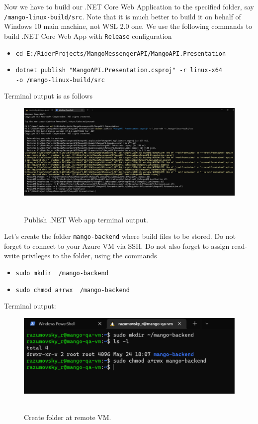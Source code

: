 Now we have to build our .NET Core Web Application to the specified folder, say \texttt{/mango-linux-build/src}.
Note that it is much better to build it on behalf of Windows 10 main machine, not WSL 2.0 one.
We use the following commands to build .NET Core Web App with \texttt{Release} configuration
\begin{itemize}
    \item \texttt{cd E:/RiderProjects/MangoMessengerAPI/MangoAPI.Presentation}
    \item \texttt{dotnet publish "MangoAPI.Presentation.csproj" -r linux-x64 \\ -o /mango-linux-build/src}
\end{itemize}
Terminal output is as follows
\begin{figure}[H]
    \centering
    \includegraphics[width=1\textwidth]{img/04_build_application}
    ~\caption{Publish .NET Web app terminal output.}\label{fig:figure9}
\end{figure}
Let's create the folder \texttt{mango-backend} where build files to be stored.
Do not forget to connect to your Azure VM via SSH\@.
Do not also forget to assign read-write privileges to the folder, using the commands
\begin{itemize}
    \item \texttt{sudo mkdir ~/mango-backend}
    \item \texttt{sudo chmod a+rwx ~/mango-backend}
\end{itemize}
Terminal output:
\begin{figure}[H]
    \centering
    \includegraphics[width=1\textwidth]{img/04_create_remote_folder}
    ~\caption{Create folder at remote VM.}\label{fig:figure10}
\end{figure}
